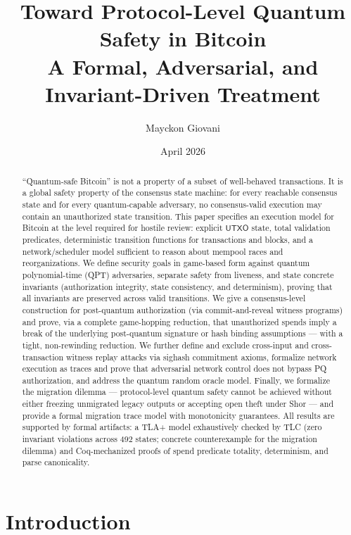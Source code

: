 \documentclass[11pt]{article}
\title{Toward Protocol-Level Quantum Safety in Bitcoin\\
\large A Formal, Adversarial, and Invariant-Driven Treatment}
\author{Mayckon Giovani}
\date{April 2026 \quad{\small(Draft for review)}}
\newcommand{\UTXO}{\mathsf{UTXO}}
\begin{document}
\maketitle

\begin{abstract}
``Quantum-safe Bitcoin'' is not a property of a subset of well-behaved transactions.
It is a global safety property of the consensus state machine: for every reachable consensus state and for every quantum-capable adversary, no consensus-valid execution may contain an unauthorized state transition.
This paper specifies an execution model for Bitcoin at the level required for hostile review: explicit $\UTXO$ state, total validation predicates, deterministic transition functions for transactions and blocks, and a network/scheduler model sufficient to reason about mempool races and reorganizations.
We define security goals in game-based form against quantum polynomial-time (QPT) adversaries, separate safety from liveness, and state concrete invariants (authorization integrity, state consistency, and determinism), proving that all invariants are preserved across valid transitions.
We give a consensus-level construction for post-quantum authorization (via commit-and-reveal witness programs) and prove, via a complete game-hopping reduction, that unauthorized spends imply a break of the underlying post-quantum signature or hash binding assumptions --- with a tight, non-rewinding reduction.
We further define and exclude cross-input and cross-transaction witness replay attacks via sighash commitment axioms, formalize network execution as traces and prove that adversarial network control does not bypass PQ authorization, and address the quantum random oracle model.
Finally, we formalize the migration dilemma --- protocol-level quantum safety cannot be achieved without either freezing unmigrated legacy outputs or accepting open theft under Shor --- and provide a formal migration trace model with monotonicity guarantees.
All results are supported by formal artifacts: a TLA+ model exhaustively checked by TLC (zero invariant violations across 492 states; concrete counterexample for the migration dilemma) and Coq-mechanized proofs of spend predicate totality, determinism, and parse canonicality.
\end{abstract}

\tableofcontents

\section{Introduction}
\end{document}
